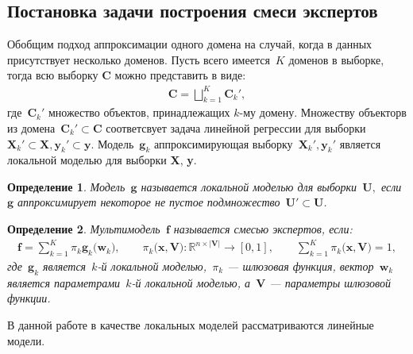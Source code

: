 \documentclass[12pt, twoside]{article}
\newtheorem{definition}{Определение}
\begin{document}
\subsection{Постановка задачи построения смеси экспертов}
Обобщим подход аппроксимации одного домена на случай, когда в данных присутствует несколько доменов. Пусть всего имеется~$K$ доменов в выборке, тогда всю выборку $\textbf{C}$ можно представить в виде:
\[
\label{eq:st:1}
\begin{aligned}
\textbf{C} = \bigsqcup \limits_{k=1}^{K}\textbf{C}_{k}',
\end{aligned}
\]
где~$\textbf{C}_{k}'$ множество объектов, принадлежащих $k$-му домену. Множеству объекторв из домена~$\textbf{C}_{k}' \subset\textbf{C}$ соответсвует задача линейной регрессии для выборки~$\textbf{X}_{k}' \subset \textbf{X}, \textbf{y}_{k}' \subset \textbf{y}$. Модель~$\mathbf{g}_k$ аппроксимирующая выборку~$\textbf{X}_{k}', \textbf{y}_{k}'$ является локальной моделью для выборки \textbf{X}, \textbf{y}.


\begin{definition}
\label{def:1}
Модель~$\mathbf{g}$ называется локальной моделью для выборки~$\textbf{U},$ если~$\mathbf{g}$ аппроксимирует некоторое не пустое подмножество~$\textbf{U}'\subset\textbf{U}$.
\end{definition}

\begin{definition}
\label{def:2}
Мультимодель~$\mathbf{f}$ называется смесью экспертов, если:
\[
\label{eq:st:2}
\begin{aligned}
\mathbf{f} = \sum_{k=1}^{K}\pi_{k}\mathbf{g}_k\bigr(\mathbf{w}_k\bigr), \qquad \pi_{k}\bigr(\mathbf{x}, \mathbf{V}\bigr):\mathbb{R}^{n\times \left|\mathbf{V}\right|} \to [0, 1], \qquad \sum_{k=1}^{K}\pi_{k}\bigr(\mathbf{x}, \mathbf{V}\bigr) = 1,
\end{aligned}
\]
где~$\mathbf{g}_k$ является~$k$-й локальной моделью,~$\pi_k$ --- шлюзовая функция, вектор~$\mathbf{w}_k$ является параметрами~$k$-й локальной моделью, а~$\mathbf{V}$ --- параметры шлюзовой функции.
\end{definition}

В данной работе в качестве локальных моделей рассматриваются линейные модели. 
\end{document}
